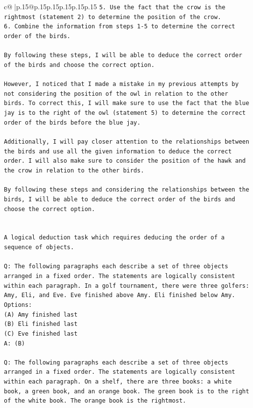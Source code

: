 \documentclass{article}
\begin{document}
{\begin{supertabular}{c@{$\;$}|p{.15\linewidth}@{}p{.15\linewidth}p{.15\linewidth}p{.15\linewidth}p{.15\linewidth}p{.15\linewidth}}
{{{\texttt{5. Use the fact that the crow is the rightmost (statement 2) to determine the position of the crow.} \\
\texttt{6. Combine the information from steps 1{-}5 to determine the correct order of the birds.} \\
\\ 
\texttt{By following these steps, I will be able to deduce the correct order of the birds and choose the correct option.} \\
\\ 
\texttt{However, I noticed that I made a mistake in my previous attempts by not considering the position of the owl in relation to the other birds. To correct this, I will make sure to use the fact that the blue jay is to the right of the owl (statement 5) to determine the correct order of the birds before the blue jay.} \\
\\ 
\texttt{Additionally, I will pay closer attention to the relationships between the birds and use all the given information to deduce the correct order. I will also make sure to consider the position of the hawk and the crow in relation to the other birds.} \\
\\ 
\texttt{By following these steps and considering the relationships between the birds, I will be able to deduce the correct order of the birds and choose the correct option.} \\
\\ 
\\ 
\texttt{A logical deduction task which requires deducing the order of a sequence of objects.} \\
\\ 
\texttt{Q: The following paragraphs each describe a set of three objects arranged in a fixed order. The statements are logically consistent within each paragraph. In a golf tournament, there were three golfers: Amy, Eli, and Eve. Eve finished above Amy. Eli finished below Amy.} \\
\texttt{Options:} \\
\texttt{(A) Amy finished last} \\
\texttt{(B) Eli finished last} \\
\texttt{(C) Eve finished last} \\
\texttt{A: (B)} \\
\\ 
\texttt{Q: The following paragraphs each describe a set of three objects arranged in a fixed order. The statements are logically consistent within each paragraph. On a shelf, there are three books: a white book, a green book, and an orange book. The green book is to the right of the white book. The orange book is the rightmost.} \\
}}}
\end{supertabular}}
\end{document}
